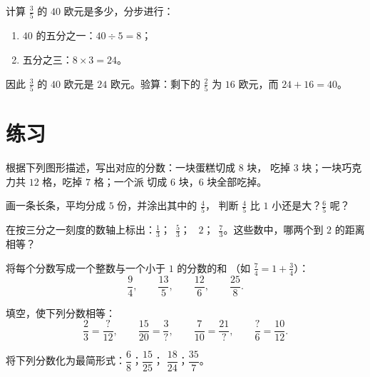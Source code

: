 \begin{example}\label{ex:g6:fractions:ofquantity}
计算 $\frac35$ 的 $40$ 欧元是多少，分步进行：
\begin{enumerate}
  \item $40$ 的五分之一：$40 \div 5 = 8$；
  \item 五分之三：$8 \times 3 = 24$。
\end{enumerate}
因此 $\frac35$ 的 $40$ 欧元是 $24$ 欧元。验算：剩下的
$\frac25$ 为 $16$ 欧元，而 $24 + 16 = 40$。
\end{example}

\section{练习}

\begin{exercise}[$\star$]\label{exo:g6:fractions:1}
根据下列图形描述，写出对应的分数：一块蛋糕切成 $8$ 块，
吃掉 $3$ 块；一块巧克力共 $12$ 格，吃掉 $7$ 格；一个派
切成 $6$ 块，$6$ 块全部吃掉。
\end{exercise}

\begin{exercise}[$\star$]\label{exo:g6:fractions:2}
画一条长条，平均分成 $5$ 份，并涂出其中的 $\frac45$，
判断 $\frac45$ 比 $1$ 小还是大？$\frac65$ 呢？
\end{exercise}

\begin{exercise}[$\star$]\label{exo:g6:fractions:3}
在按三分之一刻度的数轴上标出：$\frac13$；\ $\frac53$；
\ $2$；\ $\frac73$。这些数中，哪两个到
$2$ 的距离相等？
\end{exercise}

\begin{exercise}[$\star$]\label{exo:g6:fractions:4}
将每个分数写成一个整数与一个小于 $1$ 的分数的和
（如 $\frac74 = 1 + \frac34$）：
\[
\frac{9}{4}, \qquad \frac{13}{5}, \qquad \frac{12}{6}, \qquad
\frac{25}{8} .
\]
\end{exercise}

\begin{exercise}[$\star$]\label{exo:g6:fractions:5}
填空，使下列分数相等：
\[
\frac{2}{3} = \frac{?}{12}, \qquad
\frac{15}{20} = \frac{3}{?}, \qquad
\frac{7}{10} = \frac{21}{?}, \qquad
\frac{?}{6} = \frac{10}{12}.
\]
\end{exercise}

\begin{exercise}[$\star$]\label{exo:g6:fractions:6}
将下列分数化为最简形式：$\dfrac{6}{8}$；\quad $\dfrac{15}{25}$；
\quad $\dfrac{18}{24}$；\quad $\dfrac{35}{7}$。
\end{exercise}

